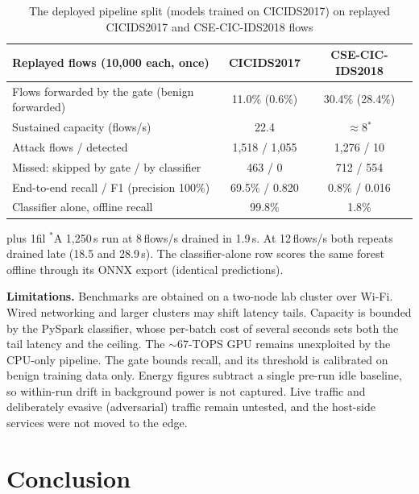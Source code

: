 \documentclass[runningheads]{llncs}
\newcommand{\tabnote}[1]{%
  \vspace{4pt}\par\noindent
  \begin{minipage}{\textwidth}%
    \footnotesize\parindent=0pt\leftskip=0pt\rightskip=0pt\parfillskip=0pt plus 1fil\relax
    #1%
  \end{minipage}}
\begin{document}
\begin{table}[htbp]
  \caption{The deployed pipeline split (models trained on CICIDS2017) on replayed CICIDS2017 and CSE-CIC-IDS2018 flows}
  \label{tab:xdataset}
  \centering
  \small
  \begin{tabular}{l c c}
    \toprule
    Replayed flows (10{,}000 each, once) & CICIDS2017 & CSE-CIC-IDS2018 \\
    \midrule
    Flows forwarded by the gate (benign forwarded) & 11.0\% (0.6\%) & 30.4\% (28.4\%) \\
    Sustained capacity (flows/s) & 22.4 & $\approx$8$^{*}$ \\
    Attack flows / detected & 1{,}518 / 1{,}055 & 1{,}276 / 10 \\
    Missed: skipped by gate / by classifier & 463 / 0 & 712 / 554 \\
    End-to-end recall / F1 (precision 100\%) & 69.5\% / 0.820 & 0.8\% / 0.016 \\
    Classifier alone, offline recall & 99.8\% & 1.8\% \\
    \bottomrule
  \end{tabular}

  \tabnote{$^{*}$A 1{,}250\,s run at 8\,flows/s drained in 1.9\,s. At 12\,flows/s both repeats drained late (18.5 and 28.9\,s). The classifier-alone row scores the same forest offline through its ONNX export (identical predictions).}
\end{table}

\textbf{Limitations.} Benchmarks are obtained on a two-node lab cluster over Wi-Fi. Wired networking and larger clusters may shift latency tails. Capacity is bounded by the PySpark classifier, whose per-batch cost of several seconds sets both the tail latency and the ceiling. The $\sim$67-TOPS GPU remains unexploited by the CPU-only pipeline. The gate bounds recall, and its threshold is calibrated on benign training data only. Energy figures subtract a single pre-run idle baseline, so within-run drift in background power is not captured. Live traffic and deliberately evasive (adversarial) traffic remain untested, and the host-side services were not moved to the edge.

\section{Conclusion}
\end{document}
